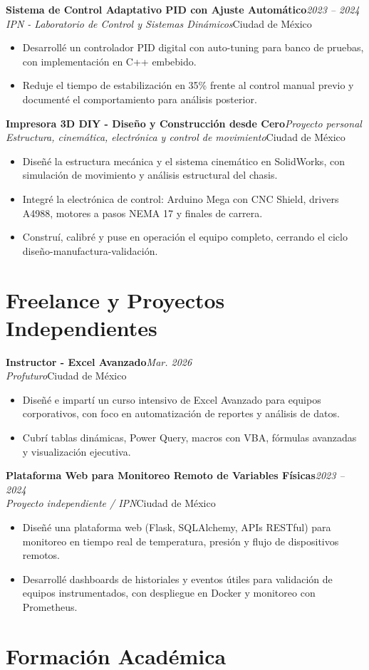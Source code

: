 \documentclass[10pt,a4paper]{article}
\newcommand{\resumeItem}[1]{\item\small #1}
\newcommand{\resumeSubheading}[4]{%
  \vspace{3pt}\noindent
  \textbf{#1}\hfill{\small\textit{\color{graytext}#2}}\\
  \textit{\color{graytext}#3}\hfill{\small\color{graytext}#4}\vspace{2pt}
}
\newcommand{\resumeItemListStart}{\begin{itemize}[leftmargin=1.15em,itemsep=1pt,topsep=2pt,partopsep=0pt,parsep=0pt]}
\newcommand{\resumeItemListEnd}{\end{itemize}\vspace{2pt}}
\begin{document}
\resumeSubheading
{Sistema de Control Adaptativo PID con Ajuste Autom\'atico}{2023 -- 2024}
{IPN - Laboratorio de Control y Sistemas Din\'amicos}{Ciudad de M\'exico}
\resumeItemListStart
  \resumeItem{Desarroll\'e un controlador PID digital con auto-tuning para banco de pruebas, con implementaci\'on en C++ embebido.}
  \resumeItem{Reduje el tiempo de estabilizaci\'on en 35\% frente al control manual previo y document\'e el comportamiento para an\'alisis posterior.}
\resumeItemListEnd

\resumeSubheading
{Impresora 3D DIY - Dise\~no y Construcci\'on desde Cero}{Proyecto personal}
{Estructura, cinem\'atica, electr\'onica y control de movimiento}{Ciudad de M\'exico}
\resumeItemListStart
  \resumeItem{Dise\~n\'e la estructura mec\'anica y el sistema cinem\'atico en SolidWorks, con simulaci\'on de movimiento y an\'alisis estructural del chasis.}
  \resumeItem{Integr\'e la electr\'onica de control: Arduino Mega con CNC Shield, drivers A4988, motores a pasos NEMA 17 y finales de carrera.}
  \resumeItem{Constru\'i, calibr\'e y puse en operaci\'on el equipo completo, cerrando el ciclo dise\~no-manufactura-validaci\'on.}
\resumeItemListEnd

\section{Freelance y Proyectos Independientes}

\resumeSubheading
{Instructor - Excel Avanzado}{Mar. 2026}
{Profuturo}{Ciudad de M\'exico}
\resumeItemListStart
  \resumeItem{Dise\~n\'e e impart\'i un curso intensivo de Excel Avanzado para equipos corporativos, con foco en automatizaci\'on de reportes y an\'alisis de datos.}
  \resumeItem{Cubr\'i tablas din\'amicas, Power Query, macros con VBA, f\'ormulas avanzadas y visualizaci\'on ejecutiva.}
\resumeItemListEnd

\resumeSubheading
{Plataforma Web para Monitoreo Remoto de Variables F\'isicas}{2023 -- 2024}
{Proyecto independiente / IPN}{Ciudad de M\'exico}
\resumeItemListStart
  \resumeItem{Dise\~n\'e una plataforma web (Flask, SQLAlchemy, APIs RESTful) para monitoreo en tiempo real de temperatura, presi\'on y flujo de dispositivos remotos.}
  \resumeItem{Desarroll\'e dashboards de historiales y eventos \'utiles para validaci\'on de equipos instrumentados, con despliegue en Docker y monitoreo con Prometheus.}
\resumeItemListEnd

\section{Formaci\'on Acad\'emica}
\end{document}
